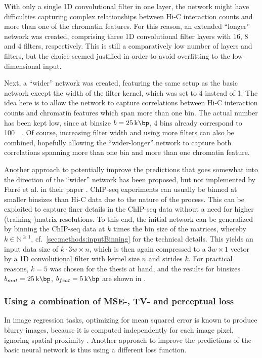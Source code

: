 With only a single 1D convolutional filter in one layer, the network might have difficulties capturing complex relationships 
between Hi-C interaction counts and more than one of the chromatin features.
For this reason, an extended ``longer'' network was created, 
comprising three 1D convolutional filter layers with 16, 8 and 4 filters, respectively.
This is still a comparatively low number of layers and filters,
but the choice seemed justified in order to avoid overfitting to the low-dimensional input.

Next, a ``wider'' network was created, featuring the same setup as the basic network
except the width of the filter kernel, which was set to 4 instead of 1.
The idea here is to allow the network to capture correlations between Hi-C interaction counts
and chromatin features which span more than one bin. 
The actual number has been kept low, since at binsize $b=\SI{25}{\kilo\bp}$, 4 bins already correspond to \SI{100}{\kilo\bp}.
Of course, increasing filter width and using more filters can also be combined,
hopefully allowing the  ``wider-longer'' network to capture both correlations
spanning more than one bin and more than one chromatin feature.

Another approach to potentially improve the predictions that goes somewhat into
the direction of the ``wider'' network has been proposed, but not implemented by Farr\'e et al. 
in their paper \cite{Farre2018a}.
ChIP-seq experiments can usually be binned at smaller binsizes than Hi-C data due to the nature of 
the process. 
This can be exploited to capture finer details in the ChIP-seq data without a need for higher (training-)matrix resolutions.
To this end, the initial network can be generalized by binning the ChIP-seq data at $k$ times the bin size of the matrices, 
whereby $k \in \mathbb{N}^{\geq1}$, cf.~\cref{sec:methods:inputBinning} for the technical details.
This yields an input data size of $k \cdot 3w \times n$, which is then again compressed to a $3w \times 1$ vector 
by a 1D convolutional filter with kernel size $n$ and strides $k$. 
For practical reasons, $k=5$ was chosen for the thesis at hand, 
and the results for binsizes $b_{mat}=\SI{25}{\kilo\bp}$, $b_{feat}=\SI{5}{\kilo\bp}$ are shown in \xxx.


\subsubsection{Using a combination of MSE-, TV- and perceptual loss}
In image regression tasks, optimizing for mean squared error is known to produce blurry images,
because it is computed independently for each image pixel, ignoring spatial proximity \cite{Isola2017,Lu2019}.
Another approach to improve the predictions of the basic neural network is thus using a different loss function.

